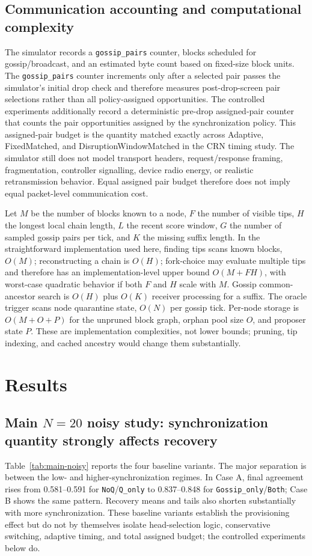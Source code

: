 \documentclass[11pt]{article}
\begin{document}
\subsection{Communication accounting and computational complexity}
The simulator records a \texttt{gossip\_pairs} counter, blocks scheduled for gossip/broadcast, and an estimated byte count based on fixed-size block units. The \texttt{gossip\_pairs} counter increments only after a selected pair passes the simulator's initial drop check and therefore measures post-drop-screen pair selections rather than all policy-assigned opportunities. The controlled experiments additionally record a deterministic pre-drop assigned-pair counter that counts the pair opportunities assigned by the synchronization policy. This assigned-pair budget is the quantity matched exactly across Adaptive, FixedMatched, and DisruptionWindowMatched in the CRN timing study. The simulator still does not model transport headers, request/response framing, fragmentation, controller signalling, device radio energy, or realistic retransmission behavior. Equal assigned pair budget therefore does not imply equal packet-level communication cost.

Let $M$ be the number of blocks known to a node, $F$ the number of visible tips, $H$ the longest local chain length, $L$ the recent score window, $G$ the number of sampled gossip pairs per tick, and $K$ the missing suffix length. In the straightforward implementation used here, finding tips scans known blocks, $O(M)$; reconstructing a chain is $O(H)$; fork-choice may evaluate multiple tips and therefore has an implementation-level upper bound $O(M+FH)$, with worst-case quadratic behavior if both $F$ and $H$ scale with $M$. Gossip common-ancestor search is $O(H)$ plus $O(K)$ receiver processing for a suffix. The oracle trigger scans node quarantine state, $O(N)$ per gossip tick. Per-node storage is $O(M+O+P)$ for the unpruned block graph, orphan pool size $O$, and proposer state $P$. These are implementation complexities, not lower bounds; pruning, tip indexing, and cached ancestry would change them substantially.

\section{Results}
\subsection{Main \texorpdfstring{$N=20$}{N=20} noisy study: synchronization quantity strongly affects recovery}
Table~\ref{tab:main-noisy} reports the four baseline variants. The major separation is between the low- and higher-synchronization regimes. In Case A, final agreement rises from 0.581--0.591 for \texttt{NoQ}/\texttt{Q\_only} to 0.837--0.848 for \texttt{Gossip\_only}/\texttt{Both}; Case B shows the same pattern. Recovery means and tails also shorten substantially with more synchronization. These baseline variants establish the provisioning effect but do not by themselves isolate head-selection logic, conservative switching, adaptive timing, and total assigned budget; the controlled experiments below do.
\end{document}
